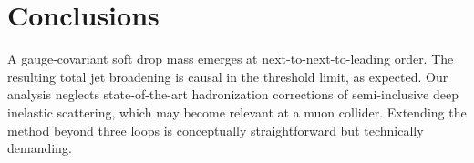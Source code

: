 \section{Conclusions}\label{sec:conclusions}

A gauge-covariant soft drop mass emerges at next-to-next-to-leading
order. The resulting total jet broadening is causal in the threshold
limit, as expected. Our analysis neglects state-of-the-art hadronization
corrections of semi-inclusive deep inelastic scattering, which may
become relevant at a muon collider. Extending the method beyond three
loops is conceptually straightforward but technically demanding.

